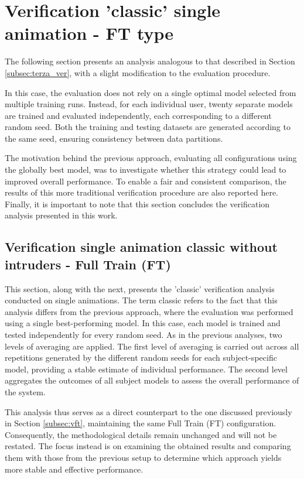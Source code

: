 \documentclass[12pt]{report}
\begin{document}
\section{Verification ’classic’ single animation - FT type}

The following section presents an analysis analogous to that described in Section \ref{subsec:terza_ver}, with a slight modification to the evaluation procedure.

In this case, the evaluation does not rely on a single optimal model selected from multiple training runs.
Instead, for each individual user, twenty separate models are trained and evaluated independently, each corresponding to a different random seed.
Both the training and testing datasets are generated according to the same seed, ensuring consistency between data partitions.

The motivation behind the previous approach, evaluating all configurations using the globally best model, was to investigate whether this strategy could lead to improved overall performance.
To enable a fair and consistent comparison, the results of this more traditional verification procedure are also reported here.
Finally, it is important to note that this section concludes the verification analysis presented in this work.

\subsection{Verification single animation classic without intruders - Full Train (FT)}

This section, along with the next, presents the 'classic' verification analysis conducted on single animations.
The term classic refers to the fact that this analysis differs from the previous approach, where the evaluation was performed using a single best-performing model.
In this case, each model is trained and tested independently for every random seed.
As in the previous analyses, two levels of averaging are applied. 
The first level of averaging is carried out across all repetitions generated by the different random seeds for each subject-specific model, providing a stable estimate of individual performance. 
The second level aggregates the outcomes of all subject models to assess the overall performance of the system.

This analysis thus serves as a direct counterpart to the one discussed previously in Section \ref{subsec:vft}, maintaining the same Full Train (FT) configuration. 
Consequently, the methodological details remain unchanged and will not be restated. 
The focus instead is on examining the obtained results and comparing them with those from the previous setup to determine which approach yields more stable and effective performance.
\end{document}
